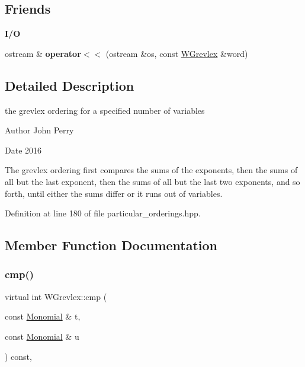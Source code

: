 \subsection*{Friends}
\begin{Indent}\textbf{ I/O}\par
\begin{DoxyCompactItemize}
\item 
\mbox{\label{class_w_grevlex_ad3b0454837c3ced9ffcd168bda55484b}} 
ostream \& {\bfseries operator$<$$<$} (ostream \&os, const \hyperlink{class_w_grevlex}{W\+Grevlex} \&word)
\end{DoxyCompactItemize}
\end{Indent}


\subsection{Detailed Description}
the grevlex ordering for a specified number of variables 

\begin{DoxyAuthor}{Author}
John Perry 
\end{DoxyAuthor}
\begin{DoxyDate}{Date}
2016
\end{DoxyDate}
The grevlex ordering first compares the sums of the exponents, then the sums of all but the last exponent, then the sums of all but the last two exponents, and so forth, until either the sums differ or it runs out of variables. 

Definition at line 180 of file particular\+\_\+orderings.\+hpp.



\subsection{Member Function Documentation}
\mbox{\label{class_w_grevlex_a0bef53b45ac32ad5246b438bc4701be1}} 
\subsubsection{\texorpdfstring{cmp()}{cmp()}}
{\footnotesize\ttfamily virtual int W\+Grevlex\+::cmp (\begin{DoxyParamCaption}\item[{const \hyperlink{class_monomial}{Monomial} \&}]{t,  }\item[{const \hyperlink{class_monomial}{Monomial} \&}]{u }\end{DoxyParamCaption}) const\hspace{0.3cm}{\ttfamily [inline]}, {\ttfamily [virtual]}}



